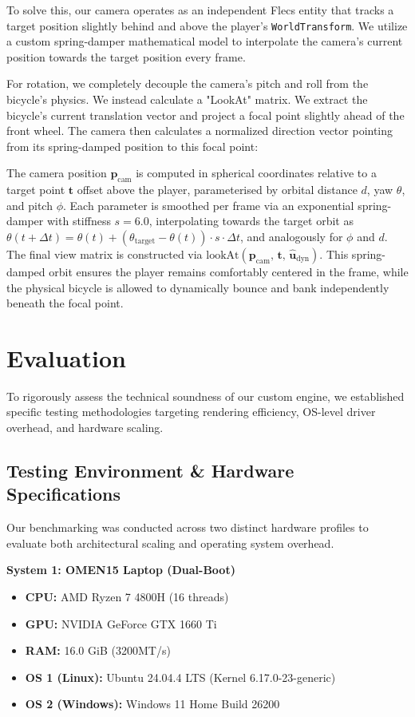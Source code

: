 \documentclass[acmtog, nonacm]{acmart}
\begin{document}
To solve this, our camera operates as an independent Flecs entity that tracks a target position slightly behind and above the player's \texttt{WorldTransform}. We utilize a custom spring-damper mathematical model to interpolate the camera's current position towards the target position every frame.

For rotation, we completely decouple the camera's pitch and roll from the bicycle's physics. We instead calculate a "LookAt" matrix. We extract the bicycle's current translation vector and project a focal point slightly ahead of the front wheel. The camera then calculates a normalized direction vector pointing from its spring-damped position to this focal point:

The camera position $\mathbf{p}_{\text{cam}}$ is computed in spherical coordinates relative to a target point $\mathbf{t}$ offset above the player, parameterised by orbital distance $d$, yaw $\theta$, and pitch $\phi$. Each parameter is smoothed per frame via an exponential spring-damper with stiffness $s = 6.0$, interpolating towards the target orbit as $\theta(t + \Delta t) = \theta(t) + (\theta_{\text{target}} - \theta(t)) \cdot s \cdot \Delta t$, and analogously for $\phi$ and $d$. The final view matrix is constructed via $\text{lookAt}(\mathbf{p}_{\text{cam}},\,\mathbf{t},\,\hat{\mathbf{u}}_{\text{dyn}})$. This spring-damped orbit ensures the player remains comfortably centered in the frame, while the physical bicycle is allowed to dynamically bounce and bank independently beneath the focal point.

\section{Evaluation}

To rigorously assess the technical soundness of our custom engine, we established specific testing methodologies targeting rendering efficiency, OS-level driver overhead, and hardware scaling. 

\subsection{Testing Environment \& Hardware Specifications}
Our benchmarking was conducted across two distinct hardware profiles to evaluate both architectural scaling and operating system overhead. 

\textbf{System 1: OMEN15 Laptop (Dual-Boot)}
\begin{itemize}
    \item \textbf{CPU:} AMD Ryzen 7 4800H (16 threads)
    \item \textbf{GPU:} NVIDIA GeForce GTX 1660 Ti
    \item \textbf{RAM:} 16.0 GiB (3200MT/s)
    \item \textbf{OS 1 (Linux):} Ubuntu 24.04.4 LTS (Kernel 6.17.0-23-generic)
    \item \textbf{OS 2 (Windows):} Windows 11 Home Build 26200
\end{itemize}
\end{document}
